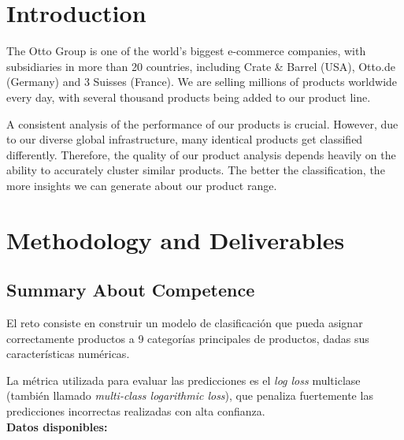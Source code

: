 \documentclass[12pt]{article}%
\begin{document}
\newpage %
\tableofcontents %


\newpage
\section{Introduction}
The Otto Group is one of the world’s biggest e-commerce companies, with subsidiaries in more than 20 countries, including Crate \& Barrel (USA), Otto.de (Germany) and 3 Suisses (France). We are selling millions of products worldwide every day, with several thousand products being added to our product line.

A consistent analysis of the performance of our products is crucial. However, due to our diverse global infrastructure, many identical products get classified differently. Therefore, the quality of our product analysis depends heavily on the ability to accurately cluster similar products. The better the classification, the more insights we can generate about our product range.

\section{Methodology and Deliverables}

\subsection{Summary About Competence}

El reto consiste en construir un modelo de clasificación que pueda asignar 
correctamente productos a 9 categorías principales de productos, dadas sus 
características numéricas. 

La métrica utilizada para evaluar las predicciones es el \textit{log loss} multiclase 
(también llamado \textit{multi-class logarithmic loss}), que penaliza fuertemente las 
predicciones incorrectas realizadas con alta confianza.\\[0.5cm]

\textbf{\large Datos disponibles: }
\end{document}
